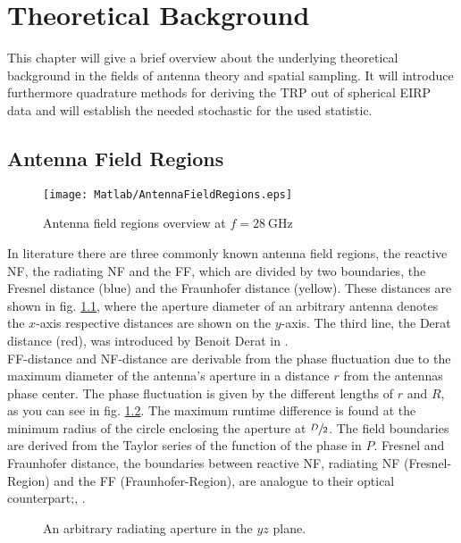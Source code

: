 \chapter{Theoretical Background}

This chapter will give a brief overview about the underlying theoretical background in the fields of antenna theory and spatial sampling. It will introduce furthermore quadrature methods for deriving the \ac{TRP} out of spherical \ac{EIRP} data and will establish the needed stochastic for the used statistic.

\section{Antenna Field Regions}

\begin{figure}[H]
\centering
\texttt{[image: Matlab/AntennaFieldRegions.eps]}
\caption{Antenna field regions overview at $f=\SI{28}{\giga\hertz}$}
\label{fig:antennafieldreg}
\end{figure}

In literature there are three commonly known antenna field regions, the reactive \ac{NF}, the radiating \ac{NF} and the \ac{FF}, which are divided by two boundaries, the Fresnel distance (blue) and the Fraunhofer distance (yellow). These distances are shown in fig. \ref{fig:antennafieldreg}, where the aperture diameter of an arbitrary antenna denotes the $x$-axis respective distances are shown on the $y$-axis. The third line, the Derat distance (red), was introduced by Benoit Derat in \cite{8393926}.\\
\ac{FF}-distance and \ac{NF}-distance are derivable from the phase fluctuation due to the maximum diameter of the antenna's aperture \cite{7942128} in a distance $r$ from the antennas phase center. The phase fluctuation is given by the different lengths of $r$ and $R$, as you can see in fig. \ref{fig:arbaperturexy}. The maximum runtime difference is found at the minimum radius of the circle enclosing the aperture at $\sfrac{D}{2}$. The field boundaries are derived from the Taylor series of the function of the phase in $P$. Fresnel and Fraunhofer distance, the boundaries between reactive \ac{NF}, radiating \ac{NF} (Fresnel-Region) and the \ac{FF} (Fraunhofer-Region), are analogue to their optical counterpart;\cite{7942128}, \cite{balanis}.

\begin{figure}[H]
\centering
\def\svgwidth{0.6\textwidth}

\caption{An arbitrary radiating aperture in the $yz$ plane. \cite{7942128}}
\label{fig:arbaperturexy}
\end{figure}

